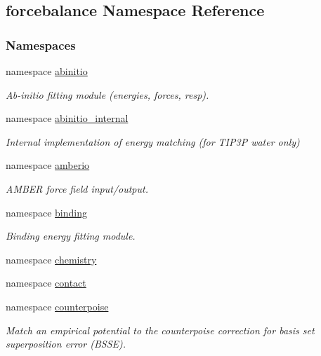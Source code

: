 \hypertarget{namespaceforcebalance}{\subsection{forcebalance Namespace Reference}
\label{namespaceforcebalance}
}
\subsubsection*{Namespaces}
\begin{DoxyCompactItemize}
\item 
namespace \hyperlink{namespaceforcebalance_1_1abinitio}{abinitio}
\begin{DoxyCompactList}\small\item\em Ab-\/initio fitting module (energies, forces, resp). \end{DoxyCompactList}\item 
namespace \hyperlink{namespaceforcebalance_1_1abinitio__internal}{abinitio\-\_\-internal}
\begin{DoxyCompactList}\small\item\em Internal implementation of energy matching (for T\-I\-P3\-P water only) \end{DoxyCompactList}\item 
namespace \hyperlink{namespaceforcebalance_1_1amberio}{amberio}
\begin{DoxyCompactList}\small\item\em A\-M\-B\-E\-R force field input/output. \end{DoxyCompactList}\item 
namespace \hyperlink{namespaceforcebalance_1_1binding}{binding}
\begin{DoxyCompactList}\small\item\em Binding energy fitting module. \end{DoxyCompactList}\item 
namespace \hyperlink{namespaceforcebalance_1_1chemistry}{chemistry}
\item 
namespace \hyperlink{namespaceforcebalance_1_1contact}{contact}
\item 
namespace \hyperlink{namespaceforcebalance_1_1counterpoise}{counterpoise}
\begin{DoxyCompactList}\small\item\em Match an empirical potential to the counterpoise correction for basis set superposition error (B\-S\-S\-E). \end{DoxyCompactList}\item 

\end{DoxyCompactItemize}
